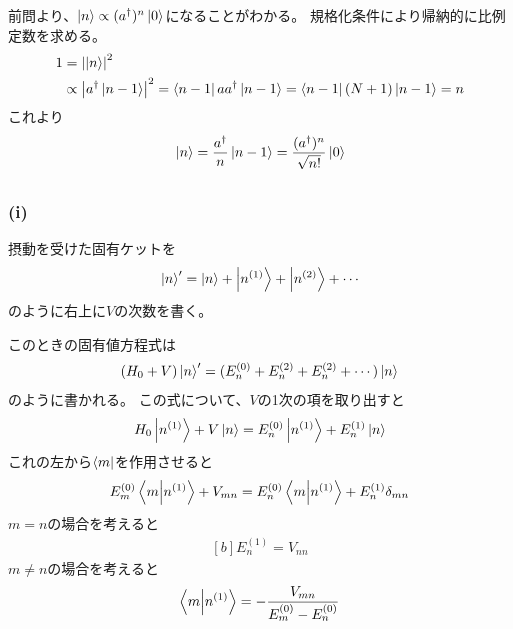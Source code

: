 \documentclass[../../sp_2018.tex]{subfiles}
\begin{document}
前問より、\(\ket{n}\propto (a^\dagger)^n\ket{0}\)になることがわかる。
規格化条件により帰納的に比例定数を求める。
\begin{equation}\begin{aligned}[b]
    1 &= \abs{\ket{n}}^2\\
    &\propto \abs{a^\dagger\ket{n-1}}^2
    =\bra{n-1}aa^\dagger\ket{n-1} = \bra{n-1}(N+1)\ket{n-1} =n
\end{aligned}\end{equation}
これより
\begin{equation}\begin{aligned}[b]
    \ket{n} =\frac{a^\dagger}{n}\ket{n-1} = \frac{(a^\dagger)^n}{\sqrt{n!}}\ket{0}
\end{aligned}\end{equation}

\subsection{}
\subsubsection*{(i)}
摂動を受けた固有ケットを
\begin{equation}\begin{aligned}[b]
    \ket{n}' = \ket{n}+\ket{n^{(1)}}+\ket{n^{(2)}}+\cdots
\end{aligned}\end{equation}
のように右上に\(V\)の次数を書く。

このときの固有値方程式は
\begin{equation}\begin{aligned}[b]
    (H_0+V)\ket{n}' = (E_n^{(0)}+E_n^{(2)}+E_n^{(2)}+\cdots)\ket{n}
\end{aligned}\end{equation}
のように書かれる。
この式について、\(V\)の1次の項を取り出すと
\begin{equation}\begin{aligned}[b]
    H_0\ket{n^{(1)}}+V\ket{n} = E_n^{(0)}\ket{n^{(1)}}+E_n^{(1)}\ket{n}
\end{aligned}\end{equation}
これの左から\(\bra{m}\)を作用させると
\begin{equation}\begin{aligned}[b]
    E_m^{(0)}\braket{m}{n^{(1)}}+V_{mn} = E_n^{(0)}\braket{m}{n^{(1)}}+E_n^{(1)}\delta_{mn}
\end{aligned}\end{equation}
\(m=n\)の場合を考えると
\begin{equation}\begin{aligned}[b]
    E_n^{(1)} = V_{nn}
\end{aligned}\end{equation}
\(m\neq n\)の場合を考えると
\begin{equation}\begin{aligned}[b]
    \braket{m}{n^{(1)}} = -\frac{V_{mn}}{E_m^{(0)}-E_n^{(0)}}
\end{aligned}\end{equation}
\end{document}
